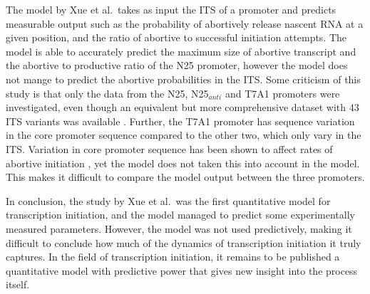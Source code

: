 The model by Xue et al.\ takes as input the ITS of a promoter and predicts
measurable output such as the probability of abortively release nascent RNA at
a given position, and the ratio of abortive to successful initiation attempts.
The model is able to accurately predict the maximum size of abortive transcript
and the abortive to productive ratio of the N25 promoter, however the model
does not mange to predict the abortive probabilities in the ITS. Some criticism
of this study is that only the data from the N25, N25$_{anti}$ and T7A1
promoters were investigated, even though an equivalent but more comprehensive
dataset with 43 ITS variants was available \cite{hsu_initial_2006}. Further,
the T7A1 promoter has sequence variation in the core promoter sequence compared
to the other two, which only vary in the ITS.  Variation in core promoter
sequence has been shown to affect rates of abortive initiation
\cite{vo_vitro_2003-1}, yet the model does not taken this into account in the
model. This makes it difficult to compare the model output between the three
promoters.

In conclusion, the study by Xue et al.\ was the first quantitative model for
transcription initiation, and the model managed to predict some experimentally
measured parameters. However, the model was not used predictively, making it
difficult to conclude how much of the dynamics of transcription initiation it
truly captures. In the field of transcription initiation, it remains to be
published a quantitative model with predictive power that gives new insight
into the process itself.
